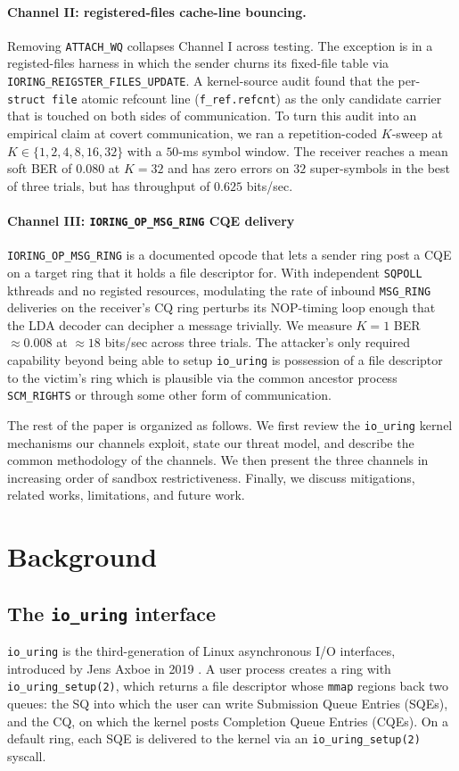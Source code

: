\documentclass[letterpaper,twocolumn,10pt]{article}
\newcommand{\code}[1]{\texttt{#1}}
\newcommand{\iouring}{\texttt{io\_uring}\xspace}
\begin{document}
\paragraph{Channel II: registered-files cache-line bouncing.} Removing \code{ATTACH\_WQ} collapses Channel I across testing. The exception is in a registed-files harness in which the sender churns its fixed-file table via \code{IORING\_REIGSTER\_FILES\_UPDATE}. A kernel-source audit found that the per-\code{struct file} atomic refcount line (\code{f\_ref.refcnt}) as the only candidate carrier that is touched on both sides of communication. To turn this audit into an empirical claim at covert communication, we ran a repetition-coded $K$-sweep at $K \in \{1,2,4,8,16,32\}$ with a $50$-ms symbol window. The receiver reaches a mean soft BER of $0.080$ at $K=32$ and has zero errors on $32$ super-symbols in the best of three trials, but has throughput of $0.625$ bits/sec.

\paragraph{Channel III: \code{IORING\_OP\_MSG\_RING} CQE delivery} \code{IORING\_OP\_MSG\_RING} is a documented opcode that lets a sender ring post a CQE on a target ring that it holds a file descriptor for. With independent \code{SQPOLL} kthreads and no registed resources, modulating the rate of inbound \code{MSG\_RING} deliveries on the receiver's CQ ring perturbs its NOP-timing loop enough that the LDA decoder can decipher a message trivially. We measure $K = 1$ BER $\approx 0.008$ at $\approx18$ bits/sec across three trials. The attacker's only required capability beyond being able to setup \iouring is possession of a file descriptor to the victim's ring which is plausible via the common ancestor process \code{SCM\_RIGHTS} or through some other form of communication.

The rest of the paper is organized as follows. We first review the \iouring kernel mechanisms our channels exploit, state our threat model, and describe the common methodology of the channels. We then present the three channels in increasing order of sandbox restrictiveness. Finally, we discuss mitigations, related works, limitations, and future work.

\section{Background}
\label{sec:background}
\subsection{The \iouring interface}
\iouring is the third-generation of Linux asynchronous I/O interfaces, introduced by Jens Axboe in 2019 \cite{axboe2019efficient}. A user process creates a ring with \code{io\_uring\_setup(2)}, which returns a file descriptor whose \code{mmap} regions back two queues: the SQ into which the user can write Submission Queue Entries (SQEs), and the CQ, on which the kernel posts Completion Queue Entries (CQEs). On a default ring, each SQE is delivered to the kernel via an \code{io\_uring\_setup(2)} syscall.
\end{document}
